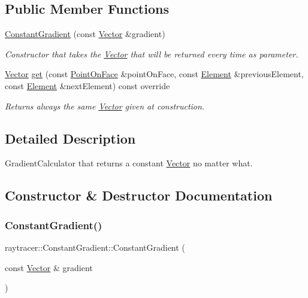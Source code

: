 \subsection*{Public Member Functions}
\begin{DoxyCompactItemize}
\item 
\hyperlink{classraytracer_1_1ConstantGradient_aa07e9f4cbdab1689e2f73d37517cd478}{Constant\+Gradient} (const \hyperlink{classraytracer_1_1Vector}{Vector} \&gradient)
\begin{DoxyCompactList}\small\item\em Constructor that takes the \hyperlink{classraytracer_1_1Vector}{Vector} that will be returned every time as parameter. \end{DoxyCompactList}\item 
\hyperlink{classraytracer_1_1Vector}{Vector} \hyperlink{classraytracer_1_1ConstantGradient_afd5e248b930551c0ad1bf84482b930b9}{get} (const \hyperlink{structraytracer_1_1PointOnFace}{Point\+On\+Face} \&point\+On\+Face, const \hyperlink{classraytracer_1_1Element}{Element} \&previous\+Element, const \hyperlink{classraytracer_1_1Element}{Element} \&next\+Element) const override
\begin{DoxyCompactList}\small\item\em Returns always the same \hyperlink{classraytracer_1_1Vector}{Vector} given at construction. \end{DoxyCompactList}\end{DoxyCompactItemize}


\subsection{Detailed Description}
Gradient\+Calculator that returns a constant \hyperlink{classraytracer_1_1Vector}{Vector} no matter what. 

\subsection{Constructor \& Destructor Documentation}
\mbox{\label{classraytracer_1_1ConstantGradient_aa07e9f4cbdab1689e2f73d37517cd478}} 
\subsubsection{\texorpdfstring{Constant\+Gradient()}{ConstantGradient()}}
{\footnotesize\ttfamily raytracer\+::\+Constant\+Gradient\+::\+Constant\+Gradient (\begin{DoxyParamCaption}\item[{const \hyperlink{classraytracer_1_1Vector}{Vector} \&}]{gradient }\end{DoxyParamCaption})\hspace{0.3cm}{\ttfamily [explicit]}}



